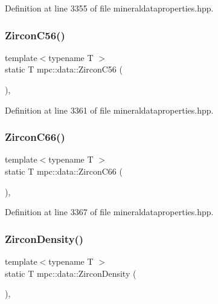 Definition at line 3355 of file mineraldataproperties.\+hpp.

\mbox{\label{namespacempc_1_1data_a3fd070df54142d3ff440f675f237c1da}} 
\subsubsection{\texorpdfstring{Zircon\+C56()}{ZirconC56()}}
{\footnotesize\ttfamily template$<$typename T $>$ \\
static T mpc\+::data\+::\+Zircon\+C56 (\begin{DoxyParamCaption}{ }\end{DoxyParamCaption})\hspace{0.3cm}{\ttfamily [inline]}, {\ttfamily [static]}}



Definition at line 3361 of file mineraldataproperties.\+hpp.

\mbox{\label{namespacempc_1_1data_a3d72e76a0a038fba393d95bc3d12ef4a}} 
\subsubsection{\texorpdfstring{Zircon\+C66()}{ZirconC66()}}
{\footnotesize\ttfamily template$<$typename T $>$ \\
static T mpc\+::data\+::\+Zircon\+C66 (\begin{DoxyParamCaption}{ }\end{DoxyParamCaption})\hspace{0.3cm}{\ttfamily [inline]}, {\ttfamily [static]}}



Definition at line 3367 of file mineraldataproperties.\+hpp.

\mbox{\label{namespacempc_1_1data_ab0ba4bb3c2e97dc416606ce9d3641a9f}} 
\subsubsection{\texorpdfstring{Zircon\+Density()}{ZirconDensity()}}
{\footnotesize\ttfamily template$<$typename T $>$ \\
static T mpc\+::data\+::\+Zircon\+Density (\begin{DoxyParamCaption}{ }\end{DoxyParamCaption})\hspace{0.3cm}{\ttfamily [inline]}, {\ttfamily [static]}}



